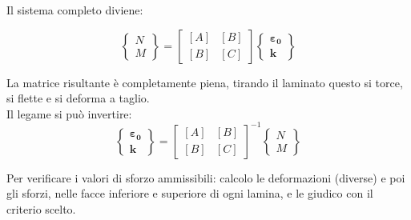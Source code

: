 Il sistema completo diviene:

\begin{equation*}
\left\{
\begin{array}{c}
N\\M
\end{array}
\right\}
=
\begin{bmatrix}
[A] & [B] \\
[B] & [C]
\end{bmatrix}
\left\{
\begin{array}{c}
\boldsymbol{\varepsilon_0}\\
\boldsymbol{k}
\end{array}
\right\}
\end{equation*}

La matrice risultante è completamente piena, tirando il laminato questo si torce, si flette e si deforma a taglio.\\Il legame si può invertire:
\begin{equation*}
\left\{
\begin{array}{c}
\boldsymbol{\varepsilon_0}\\
\boldsymbol{k}
\end{array}
\right\}= \begin{bmatrix}
[A] & [B] \\
[B] & [C]
\end{bmatrix}^{-1}
\left\{
\begin{array}{c}
N\\M
\end{array}
\right\}
\end{equation*}

Per verificare i valori di sforzo ammissibili: calcolo le deformazioni (diverse) e poi gli sforzi, nelle facce inferiore e superiore di ogni lamina, e le giudico con il criterio scelto.